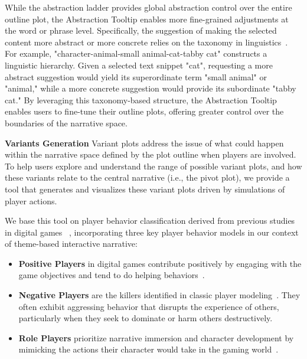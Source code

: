 While the abstraction ladder provides global abstraction control over the entire outline plot, the Abstraction Tooltip enables more fine-grained adjustments at the word or phrase level. Specifically, the suggestion of making the selected content more abstract or more concrete relies on the taxonomy in linguistics~\cite{hayes1983cognitive}. For example, "character-animal-small animal-cat-tabby cat" constructs a linguistic hierarchy. Given a selected text snippet "cat", requesting a more abstract suggestion would yield its superordinate term "small animal" or "animal," while a more concrete suggestion would provide its subordinate "tabby cat." By leveraging this taxonomy-based structure, the Abstraction Tooltip enables users to fine-tune their outline plots, offering greater control over the boundaries of the narrative space.











\noindent \textbf{Variants Generation} 
Variant plots address the issue of what could happen within the narrative space defined by the plot outline when players are involved. To help users explore and understand the range of possible variant plots, and how these variants relate to the central narrative (i.e., the pivot plot), we provide a tool that generates and visualizes these variant plots driven by simulations of player actions.


We base this tool on player behavior classification derived from previous studies in digital games ~\cite{yannakakis2013player,worth2015dimensions}, incorporating three key player behavior models in our context of theme-based interactive narrative:

\begin{itemize}
    \item \textbf{Positive Players} in digital games contribute positively by engaging with the game objectives and tend to do helping behaviors~\cite{velez2013helping,bostan2009player}.
    \item \textbf{Negative Players} are the killers identified in classic player modeling~\cite{majors2021some,hamari2014player}. They often exhibit aggressing behavior that disrupts the experience of others, particularly when they seek to dominate or harm others destructively.
    \item \textbf{Role Players} prioritize narrative immersion and character development by mimicking the actions their character would take in the gaming world~\cite{praetorius2020avatars}.    
\end{itemize}

